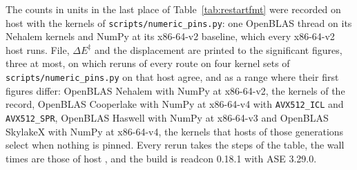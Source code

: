 The counts in units in the last place of Table~\ref*{tab:restartfmt} were recorded on host \rfHost{} with the kernels of \texttt{scripts/numeric\_pins.py}: one OpenBLAS thread on its Nehalem kernels and NumPy at its x86-64-v2 baseline, which every x86-64-v2 host runs. File, $\Delta E^\ddagger$ and the displacement are printed to the significant figures, three at most, on which reruns of every route on four kernel sets of \texttt{scripts/numeric\_pins.py} on that host agree, and as a range where their first figures differ: OpenBLAS Nehalem with NumPy at x86-64-v2, the kernels of the record, OpenBLAS Cooperlake with NumPy at x86-64-v4 with \texttt{AVX512\_ICL} and \texttt{AVX512\_SPR}, OpenBLAS Haswell with NumPy at x86-64-v3 and OpenBLAS SkylakeX with NumPy at x86-64-v4, the kernels that hosts of those generations select when nothing is pinned. Every rerun takes the steps of the table, the wall times are those of host \rfWallHost{}, and the build is readcon 0.18.1 with ASE 3.29.0.
